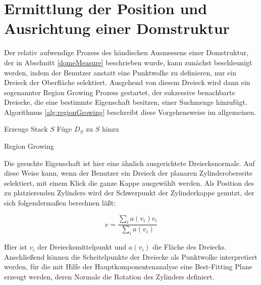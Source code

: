 \section{Ermittlung der Position und Ausrichtung einer Domstruktur}

Der relativ aufwendige Prozess des h\"andischen Ausmessens einer Domstruktur, der in Abschnitt \ref{domeMeasure} beschrieben wurde, kann zun\"achst beschleunigt werden, indem der Benutzer anstatt eine Punktwolke zu definieren, nur ein Dreieck der Oberfläche selektiert. Ausgehend von diesem Dreieck wird dann ein sogenannter Region Growing Prozess gestartet, der sukzessive benachbarte Dreiecke, die eine bestimmte Eigenschaft besitzen, einer Suchmenge hinzuf\"ugt.
Algorithmus \ref{alg:regionGrowing} beschreibt diese Vorgehensweise im allgemeinen.

\begin{algorithm}[H]
 \SetLine %
 Erzeuge Stack $S$\;
 Füge $D_{S}$ zu $S$ hinzu\;
 \caption{Region Growing}
 \label{alg:regionGrowing}
\end{algorithm}

Die gesuchte Eigenschaft ist hier eine \"ahnlich ausgerichtete Dreiecksnormale. Auf diese Weise kann, wenn der Benutzer ein Dreieck der planaren Zylinderoberseite selektiert, mit einem Klick die ganze Kappe ausgew\"ahlt werden.
Als Position des zu platzierenden Zylinders wird der Schwerpunkt der Zylinderkappe genutzt, der sich folgenderma{\ss}en berechnen l\"a{\ss}t:

\begin{equation}
v=\frac{\sum_{i}  a(v_{i})v_{i}}{\sum_{i}  a(v_{i})}
\end{equation}

Hier ist $v_{i}$ der Dreiecksmittelpunkt und  $a(v_{i})$ die Fläche des Dreiecks. Anschlie{\ss}end können die Scheitelpunkte der Dreiecke als Punktwolke interpretiert werden, f\"ur die mit Hilfe der Hauptkomponentenanalyse eine Best-Fitting Plane erzeugt werden, deren Normale die Rotation des Zylinders definiert. 

